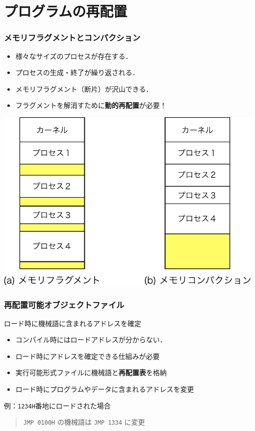 \documentclass{beamer}                   %
\begin{document}
\section{プログラムの再配置}
\begin{frame}
  \frametitle{メモリフラグメントとコンパクション}
  \begin{itemize}
    \item 様々なサイズのプロセスが存在する．
    \item プロセスの生成・終了が繰り返される．
    \item メモリフラグメント（断片）が沢山できる．
    \item フラグメントを解消すために{\bf 動的再配置}が必要！
  \end{itemize}
  \begin{center}
    \includegraphics[scale=0.60]{Fig/memoryCompaction-crop.pdf}\\
  \end{center}
\end{frame}

\begin{frame}
  \frametitle{再配置可能オブジェクトファイル}
  ロード時に機械語に含まれるアドレスを確定
  \begin{itemize}
    \item コンパイル時にはロードアドレスが分からない．
    \item ロード時にアドレスを確定できる仕組みが必要
    \item 実行可能形式ファイルに機械語と{\bf 再配置表}を格納
    \item ロード時にプログラムやデータに含まれるアドレスを変更
  \end{itemize}
  \vfill
    例：{\tt 1234H}番地にロードされた場合\\
    \begin{quote}
    {\tt JMP 0100H} の機械語は {\tt JMP 1334} に変更
    \end{quote}
\end{frame}
\end{document}
